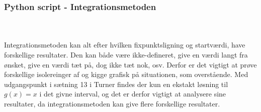 \subsubsection*{Python script - Integrationsmetoden}
%
\lstset{style=mystyle}

%
\phantom{matematik}\\\\
Integrationsmetoden kan alt efter hvilken fixpunktsligning og startværdi, have forskellige resultater. 
Den kan både være ikke-defineret, give en værdi langt fra ønsket, give en værdi tæt på, dog ikke tæt nok, osv. 
Derfor er det vigtigt at prøve forskellige isolereinger af og kigge grafisk på situationen, som overstående. 
Med udgangspunkt i sætning 13 i Turner findes der kun en ekstakt løsning til $g(x)=x$ i det givne interval, og det er derfor vigtigt at analysere sine resultater, da integrationsmetoden kan give flere forskellige resultater.
\\
% 